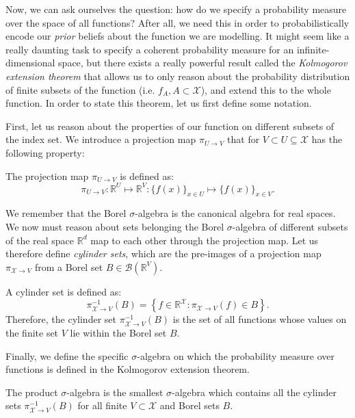 Now, we can ask ourselves the question: how do we specify a probability measure over the space of all functions? After all, we need this in order to probabilistically encode our \emph{prior} beliefs about the function we are modelling. It might seem like a really daunting task to specify a coherent probability measure for an infinite-dimensional space, but there exists a really powerful result called the \textit{Kolmogorov extension theorem} that allows us to only reason about the probability distribution of finite subsets of the function (i.e. $f_A, A \subset \mathcal{X}$), and extend this to the whole function. In order to state this theorem, let us first define some notation.

First, let us reason about the properties of our function on different subsets of the index set. We introduce a projection map $\pi_{U \rightarrow V}$ that for $V \subset U \subseteq \mathcal{X}$ has the following property:
\label{ntn:projection_map}
\begin{definition}
    \label{def:projection_map}
    The projection map $\pi_{U \rightarrow V}$ is defined as:
    $$
    \pi_{U \rightarrow V}: \mathbb{R}^U \mapsto \mathbb{R}^V:\{f(x)\}_{x \in U} \mapsto \{f(x)\}_{x \in V}.
    $$
\end{definition}

We remember that the Borel $\sigma$-algebra is the canonical algebra for real spaces. We now must reason about sets belonging the Borel $\sigma$-algebra of different subsets of the real space $\mathbb{R}^d$ map to each other through the projection map. Let us therefore define \textit{cylinder sets}, which are the pre-images of a projection map $\pi_{\mathcal{X} \rightarrow V}$ from a Borel set $B \in \mathcal{B}\left(\mathbb{R}^V\right)$.
\label{ntn:cylinder_set}
\begin{definition}
    \label{def:cylinder_set}
    A cylinder set is defined as:
    $$
    \pi_{\mathcal{X} \rightarrow V}^{-1}(B)=\left\{f \in \mathbb{R}^{\mathcal{X}}: \pi_{\mathcal{X} \rightarrow V}(f) \in B\right\}.
    $$
    Therefore, the cylinder set $\pi_{\mathcal{X} \rightarrow V}^{-1}(B)$ is the set of all functions whose values on the finite set $V$ lie within the Borel set $B$.
\end{definition}

Finally, we define the specific $\sigma$-algebra on which the probability measure over functions is defined in the Kolmogorov extension theorem. 

\begin{definition}
    \label{def:product_sigma_algebra}
    The product $\sigma$-algebra is the smallest $\sigma$-algebra which contains all the cylinder sets $\pi_{\mathcal{X} \rightarrow V}^{-1}(B)$ for all finite $V \subset \mathcal{X}$ and Borel sets $B$.
\end{definition}

